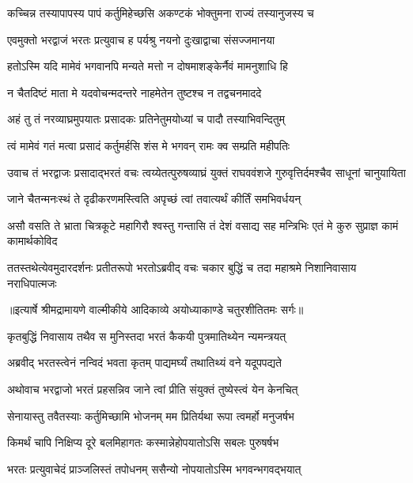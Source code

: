 \twolineshloka
{कच्चिन्न तस्यापापस्य पापं कर्तुमिहेच्छसि}
{अकण्टकं भोक्तुमना राज्यं तस्यानुजस्य च} %

\twolineshloka
{एवमुक्तो भरद्वाजं भरतः प्रत्युवाच ह}
{पर्यश्रु नयनो दुःखाद्वाचा संसज्जमानया} %

\twolineshloka
{हतोऽस्मि यदि मामेवं भगवानपि मन्यते}
{मत्तो न दोषमाशङ्केर्नैवं मामनुशाधि हि} %

\twolineshloka
{न चैतदिष्टं माता मे यदवोचन्मदन्तरे}
{नाहमेतेन तुष्टश्च न तद्वचनमाददे} %

\twolineshloka
{अहं तु तं नरव्याघ्रमुपयातः प्रसादकः}
{प्रतिनेतुमयोध्यां च पादौ तस्याभिवन्दितुम्} %

\twolineshloka
{त्वं मामेवं गतं मत्वा प्रसादं कर्तुमर्हसि}
{शंस मे भगवन् रामः क्व सम्प्रति महीपतिः} %

\threelineshloka
{उवाच तं भरद्वाजः प्रसादाद्भरतं वचः}
{त्वय्येतत्पुरुषव्याघ्रं युक्तं राघववंशजे}
{गुरुवृत्तिर्दमश्चैव साधूनां चानुयायिता} %

\twolineshloka
{जाने चैतन्मनःस्थं ते दृढीकरणमस्त्विति}
{अपृच्छं त्वां तवात्यर्थं कीर्तिं समभिवर्धयन्} %

\threelineshloka
{असौ वसति ते भ्राता चित्रकूटे महागिरौ}
{श्वस्तु गन्तासि तं देशं वसाद्य सह मन्त्रिभिः}
{एतं मे कुरु सुप्राज्ञ कामं कामार्थकोविद} %

\fourlineindentedshloka
{ततस्तथेत्येवमुदारदर्शनः}
{प्रतीतरूपो भरतोऽब्रवीद् वचः}
{चकार बुद्धिं च तदा महाश्रमे}
{निशानिवासाय नराधिपात्मजः} %


{॥इत्यार्षे श्रीमद्रामायणे वाल्मीकीये आदिकाव्ये अयोध्याकाण्डे चतुरशीतितमः सर्गः॥}


\twolineshloka
{कृतबुद्धिं निवासाय तथैव स मुनिस्तदा}
{भरतं कैकयी पुत्रमातिथ्येन न्यमन्त्रयत्} %

\twolineshloka
{अब्रवीद् भरतस्त्वेनं नन्विदं भवता कृतम्}
{पाद्यमर्घ्यं तथातिथ्यं वने यदूपपद्यते} %

\twolineshloka
{अथोवाच भरद्वाजो भरतं प्रहसन्निव}
{जाने त्वां प्रीति संयुक्तं तुष्येस्त्वं येन केनचित्} %

\twolineshloka
{सेनायास्तु तवैतस्याः कर्तुमिच्छामि भोजनम्}
{मम प्रितिर्यथा रूपा त्वमर्हो मनुजर्षभ} %

\twolineshloka
{किमर्थं चापि निक्षिप्य दूरे बलमिहागतः}
{कस्मान्नेहोपयातोऽसि सबलः पुरुषर्षभ} %

\twolineshloka
{भरतः प्रत्युवाचेदं प्राञ्जलिस्तं तपोधनम्}
{ससैन्यो नोपयातोऽस्मि भगवन्भगवद्भयात्} %

